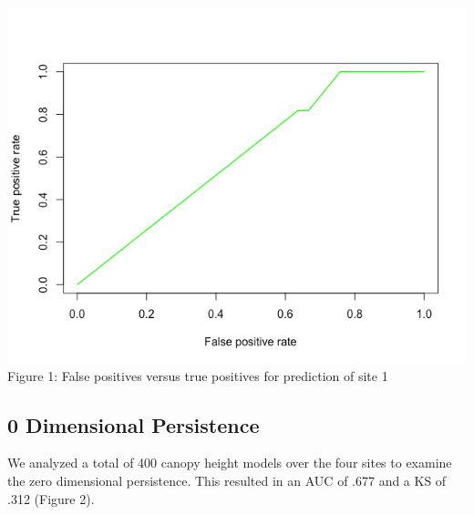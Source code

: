 \documentclass[10pt]{article}
\begin{document}
\includegraphics[scale = 0.5]{transect_roc}\\
Figure 1: False positives versus true positives for prediction of site 1


\subsection*{0 Dimensional Persistence}

We analyzed a total of 400 canopy height models over the four sites to examine the zero dimensional persistence. This resulted in an AUC of .677 and a KS of .312 (Figure 2).\\
\end{document}
